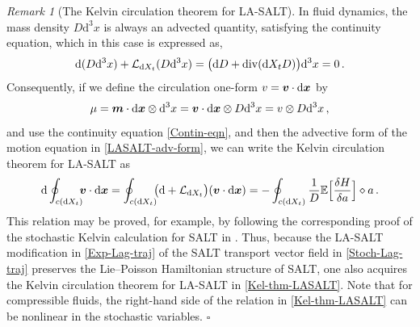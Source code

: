 \documentclass[11pt, oneside]{article}   	%
\numberwithin{equation}{section}
\theoremstyle{plain}
\theoremstyle{definition}
\theoremstyle{remark}
\newtheorem{remark}[theorem]{Remark}
\newcommand{\<}{\langle}
\renewcommand{\>}{\rangle}
\def\diff{\textnormal{d}}
\def\rmd{{\mathrm{d}}}
\newcommand{\mb}[1]{\mbox{\boldmath{$#1$}}}
\begin{document}
\begin{remark}[The Kelvin circulation theorem for LA-SALT]\label{kelvin} 
In fluid dynamics, the mass density $D {\rmd}^3x$ is always an advected quantity, satisfying 
the continuity equation, which in this case is expressed as,
\begin{align}
\diff {(D {\rmd}^3x)} + \mathcal{L}_{\diff{X_t}}(D {\rmd}^3x)  
= \big(\diff{D} + {\rm div}(\diff{X_t} D)\big) {\rmd}^3x
= 0
\,.
\label{Contin-eqn}
\end{align}
Consequently, if we define the circulation one-form $v= \mb{v}\cdot {\rmd} \mb{x}$ by 
\begin{align}
\mu = \mb{m}\cdot {\rmd} \mb{x} \otimes {\rmd}^3x = \mb{v}\cdot {\rmd} \mb{x} \otimes D {\rmd}^3x
= {v} \otimes D {\rmd}^3x
\,,\label{Circ-1form}
\end{align}
and use the continuity equation \eqref{Contin-eqn},
and then the advective form of the motion equation in \eqref{LASALT-adv-form}, we can write the Kelvin circulation theorem for LA-SALT as
\begin{align}
\rmd \oint_{c(\diff{X_t})} \!\!\!{\mb v}\cdot {\rmd} {\mb x}  
= \oint_{c(\diff{X_t})} \!\!\!
\big(\diff +  \mathcal{L}_{\diff{X_t}}\big)({\mb v}\cdot {\rmd}{\mb x})  
= - \oint_{c(\diff{X_t})} \frac{1}{D} 
\mathbb{E}\Big[\frac{\delta H }{\delta a}\Big]\diamond a
\,.\label{Kel-thm-LASALT}
\end{align}
This relation may be proved, for example, by following the corresponding proof of the stochastic Kelvin calculation for SALT in  \cite{de2019implications}. Thus, because the LA-SALT modification in \eqref{Exp-Lag-traj} of the SALT transport vector field in \eqref{Stoch-Lag-traj} preserves the Lie--Poisson Hamiltonian structure of SALT, one also acquires the Kelvin circulation theorem for LA-SALT in \eqref{Kel-thm-LASALT}. Note that for compressible fluids, the right-hand side of the relation in \eqref{Kel-thm-LASALT} can be nonlinear in the stochastic variables. \hfill $\square$
\end{remark}
\end{document}

